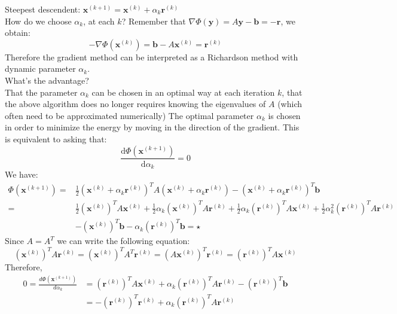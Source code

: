 \documentclass[11pt]{book}
\begin{document}
Steepest descendent: $\mathbf{x}^{(k+1)}=\mathbf{x}^{(k)}+\alpha_{k} \mathbf{r}^{(k)}$\\How do we choose $\alpha_{k}$, at each $k$? Remember that $\nabla \Phi(\mathbf{y})=A \mathbf{y}-\mathbf{b}=-\mathbf{r}$, we obtain:
$$
-\nabla \Phi\left(\mathbf{x}^{(k)}\right)=\mathbf{b}-A \mathbf{x}^{(k)}=\mathbf{r}^{(k)}
$$
Therefore the gradient method can be interpreted as a Richardson method with dynamic parameter $\alpha_{k}$.\\
What's the advantage?\\
That the parameter $\alpha_{k}$ can be chosen in an optimal way at each iteration $k$, that the above algorithm does no longer requires knowing the eigenvalues of $A$ (which often need to be approximated numerically) The optimal parameter $\alpha_{k}$ is chosen in order to minimize the energy by moving in the direction of the gradient. This is equivalent to asking that:
$$\frac{\mathrm{d} \Phi\left(\mathbf{x}^{(k+1)}\right)}{\mathrm{d} \alpha_k}=0$$
We have:
$$
\begin{aligned}
\Phi\left(\boldsymbol{x}^{(k+1)}\right)= & \frac{1}{2}\left(\boldsymbol{x}^{(k)}+\alpha_{k} \boldsymbol{r}^{(k)}\right)^{T} A\left(\boldsymbol{x}^{(k)}+\alpha_{k} \boldsymbol{r}^{(k)}\right)-\left(\boldsymbol{x}^{(k)}+\alpha_{k} \boldsymbol{r}^{(k)}\right)^{T} \boldsymbol{b} \\
= & \frac{1}{2}\left(\boldsymbol{x}^{(k)}\right)^{T} A \boldsymbol{x}^{(k)}+\frac{1}{2} \alpha_{k}\left(\boldsymbol{x}^{(k)}\right)^{T} A \boldsymbol{r}^{(k)}+\frac{1}{2} \alpha_{k}\left(\boldsymbol{r}^{(k)}\right)^{T} A \boldsymbol{x}^{(k)}+\frac{1}{2} \alpha_{k}^{2}\left(\boldsymbol{r}^{(k)}\right)^{T} A \boldsymbol{r}^{(k)} \\
& -\left(\boldsymbol{x}^{(k)}\right)^{T} \boldsymbol{b}-\alpha_{k}\left(\boldsymbol{r}^{(k)}\right)^{T} \boldsymbol{b} = \star
\end{aligned}
$$
Since $A=A^{T}$ we can write the following equation:
$$
\left(\boldsymbol{x}^{(k)}\right)^{T} A \boldsymbol{r}^{(k)}=\left(\boldsymbol{x}^{(k)}\right)^{T} A^{T} \boldsymbol{r}^{(k)}=\left(A \boldsymbol{x}^{(k)}\right)^{T} \boldsymbol{r}^{(k)}=\left(\boldsymbol{r}^{(k)}\right)^{T} A \boldsymbol{x}^{(k)}$$
Therefore,
$$
\begin{aligned}
0=\frac{d \Phi\left(\boldsymbol{x}^{(k+1)}\right)}{d \alpha_{k}} & =\left(\boldsymbol{r}^{(k)}\right)^{T} A \boldsymbol{x}^{(k)}+\alpha_{k}\left(\boldsymbol{r}^{(k)}\right)^{T} A \boldsymbol{r}^{(k)}-\left(\boldsymbol{r}^{(k)}\right)^{T} \boldsymbol{b} \\
& =-\left(\boldsymbol{r}^{(k)}\right)^{T} \boldsymbol{r}^{(k)}+\alpha_{k}\left(\boldsymbol{r}^{(k)}\right)^{T} A \boldsymbol{r}^{(k)}
\end{aligned}
$$
\end{document}
